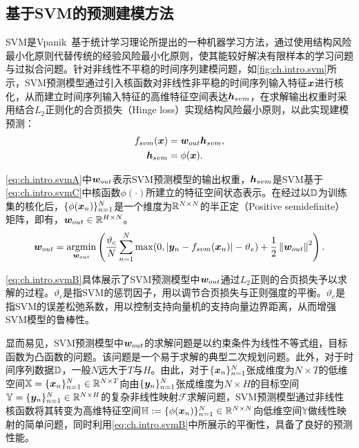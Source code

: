 \subsection{基于SVM的预测建模方法}
SVM是Vpanik~\cite{vapnikNature2013}基于统计学习理论所提出的一种机器学习方法，通过使用结构风险最小化原则代替传统的经验风险最小化原则，使其能较好解决有限样本的学习问题与过拟合问题。针对非线性不平稳的时间序列建模问题，如\autoref{fig:ch.intro.svm}所示，SVM预测模型通过引入核函数对非线性非平稳的时间序列输入特征\(\bm{x}\)进行核化，从而建立时间序列输入特征的高维特征空间表达\(\bm{h}_{svm}\)，在求解输出权重时采用结合$L_2$正则化的合页损失（Hinge loss）实现结构风险最小原则，以此实现建模预测：
\begin{align}
    f_{svm}(\bm{x}) &= \bm{w}_{out}\bm{h}_{svm}, \label{eq:ch.intro.svmA} \\
    \bm{h}_{svm} &= \phi (\bm{x})  \label{eq:ch.intro.svmC}.
\end{align}

\autoref{eq:ch.intro.svmA}中\(\bm{w}_{out}\)表示SVM预测模型的输出权重，\(\bm{h}_{svm}\)是SVM基于\autoref{eq:ch.intro.svmC}中核函数\(\phi(\cdot)\)所建立的特征空间状态表示。在经过以\(\mathbb{D}\)为训练集的核化后，\(\{\phi(\bm{x}_n)\}_{n=1}^N\)是一个维度为\(\mathbb{R}^{N\times N}\)的半正定（Positive semidefinite）矩阵，即有，\(\bm{w}_{out} \in \mathbb{R}^{H\times N}\)。
{\setlength{\abovedisplayskip}{12pt plus 3pt}
\setlength{\belowdisplayskip}{12pt plus 3pt}
\begin{equation}
    \bm{w}_{out} = \operatorname*{argmin}_{\bm{w}_{out} }\left(\frac{\vartheta_{c}}{N}\sum^{N}_{n=1}\max(0, \left\lvert \bm{y}_n - f_{svm}(\bm{x}_n)\right\rvert  - \vartheta_{e}) + \frac{1}{2}\left\lVert \bm{w}_{out} \right\rVert^2\right)  .\label{eq:ch.intro.svmB}
\end{equation}
}

\autoref{eq:ch.intro.svmB}具体展示了SVM预测模型中\(\bm{w}_{out}\)通过$L_2$正则的合页损失予以求解的过程。\(\vartheta_{c}\)是指SVM的惩罚因子，用以调节合页损失与正则强度的平衡。\(\vartheta_{e}\)是指SVM的误差松弛系数，用以控制支持向量机的支持向量边界距离，从而增强SVM模型的鲁棒性。

显而易见，SVM预测模型中\(\bm{w}_{out}\)的求解问题是以约束条件为线性不等式组，目标函数为凸函数的问题。该问题是一个易于求解的典型二次规划问题。此外，对于时间序列数据\(\mathbb{D}\)，一般\(N\)远大于\(T\)与\(H\)。由此，对于\(\{\bm{x}_n\}_{n=1}^N\)张成维度为\(N \times T\)的低维空间\(\mathbb{X} = \{\bm{x}_n\}_{n=1}^N \in \mathbb{R}^{N \times T}\)向由\(\{\bm{y}_n\}_{n=1}^N\)张成维度为\(N \times H\)的目标空间\(\mathbb{Y} = \{\bm{y}_n\}_{n=1}^N \in \mathbb{R}^{N \times H}\)的复杂非线性映射\(\mathcal{F}\)求解问题，SVM预测模型通过非线性核函数将其转变为高维特征空间\(\mathbb{H} := \{\phi(\bm{x}_n)\}_{n=1}^N \in \mathbb{R}^{N \times N}\)向低维空间\(\mathbb{Y}\)做线性映射的简单问题，同时利用\autoref{eq:ch.intro.svmB}中所展示的平衡性，具备了良好的预测性能。

